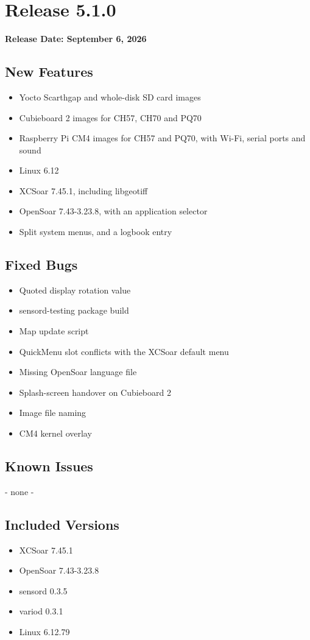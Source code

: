 \chapter*{Release 5.1.0}

\begin{flushleft}
	\textbf{Release Date: September 6, 2026}
\end{flushleft}

\section*{New Features}

\begin{itemize}
	\item Yocto Scarthgap and whole-disk SD card images
	\item Cubieboard 2 images for CH57, CH70 and PQ70
	\item Raspberry Pi CM4 images for CH57 and PQ70, with Wi-Fi, serial ports and sound
	\item Linux 6.12
	\item XCSoar 7.45.1, including libgeotiff
	\item OpenSoar 7.43-3.23.8, with an application selector
	\item Split system menus, and a logbook entry
\end{itemize}

\section*{Fixed Bugs}
\begin{itemize}
	\item Quoted display rotation value
	\item sensord-testing package build
	\item Map update script
	\item QuickMenu slot conflicts with the XCSoar default menu
	\item Missing OpenSoar language file
	\item Splash-screen handover on Cubieboard 2
	\item Image file naming
	\item CM4 kernel overlay
\end{itemize}

\section*{Known Issues}
	- none -

\section*{Included Versions}

\begin{itemize}
	\item XCSoar 7.45.1
	\item OpenSoar 7.43-3.23.8
	\item sensord 0.3.5
	\item variod 0.3.1
	\item Linux 6.12.79
\end{itemize}
